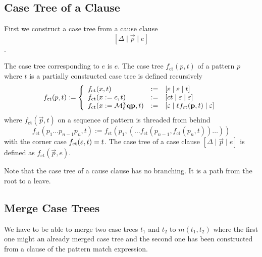 \subsection{Case Tree of a Clause}

First we construct a case tree from a cause clause
$$ [\Delta \mid \vec p \mid e] $$.

{
    \def\ct{f_\text{ct}}
    The case tree corresponding to $e$ is $e$. The case tree $\ct(p, t)$ of a
    pattern $p$ where $t$ is a partially constructed case tree is defined
    recursively
    $$
    \ct(p, t) := \left\{
        \begin{array}{lll}
            \ct(x,t)
            &:=&
            [\empty \mid \empty \mid t]
            \\
            \ct(x := c, t)
            &:=&
            [c t \mid \empty \mid \empty]
            \\
            \ct(x := \Make^\Ind_\ell \vec q \vec p, t)
            &:=&
            [\empty \mid \ell \ct(\vec p, t) \mid \empty]
        \end{array}
    \right.
    $$
    where $\ct(\vec p, t)$ on a sequence of pattern is threaded from behind
    $$
    \ct(p_1 \ldots p_{n-1} p_n, t)
    :=
    \ct(p_1, (\ldots \ct(p_{n-1}, \ct(p_n, t))\ldots))
    $$
    with the corner case $\ct(\empty, t) = t$.
    The case tree of a case clause $[\Delta \mid \vec p \mid e]$ is defined as
    $\ct(\vec p, e)$.
}

Note that the case tree of a cause clause has no branching.
It is a path from the root to a leave.



\subsection{Merge Case Trees}

We have to be able to merge two case trees $t_1$
and $t_2$ to $m(t_1, t_2)$ where the first one might an already merged case tree
and the second one has been constructed from a clause of the pattern match
expression.

